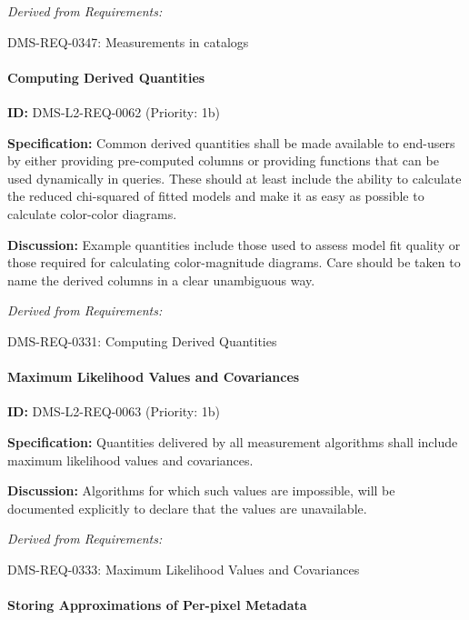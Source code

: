 \documentclass[SE,toc,lsstdraft]{lsstdoc}
\begin{document}
\emph{Derived from Requirements:}

DMS-REQ-0347:
Measurements in catalogs \newline

\paragraph{Computing Derived Quantities}\hfill  %

\label{DMS-L2-REQ-0062}
\textbf{ID:} DMS-L2-REQ-0062 (Priority: 1b)

\textbf{Specification:} Common derived quantities shall be made available to end-users by either providing pre-computed columns or providing functions that can be used dynamically in queries. These should at least include the ability to calculate the reduced chi-squared of fitted models and make it as easy as possible to calculate color-color diagrams.

\textbf{Discussion:} Example quantities include those used to assess model fit quality or those required for calculating color-magnitude diagrams. Care should be taken to name the derived columns in a clear unambiguous way.

\emph{Derived from Requirements:}

DMS-REQ-0331:
Computing Derived Quantities \newline

\paragraph{Maximum Likelihood Values and Covariances}\hfill  %

\label{DMS-L2-REQ-0063}
\textbf{ID:} DMS-L2-REQ-0063 (Priority: 1b)

\textbf{Specification:} Quantities delivered by all measurement algorithms shall include maximum likelihood values and covariances.

\textbf{Discussion:} Algorithms for which such values are impossible, will be documented explicitly to declare that the values are unavailable.

\emph{Derived from Requirements:}

DMS-REQ-0333:
Maximum Likelihood Values and Covariances \newline

\paragraph{Storing Approximations of Per-pixel Metadata}\hfill  %
\end{document}
